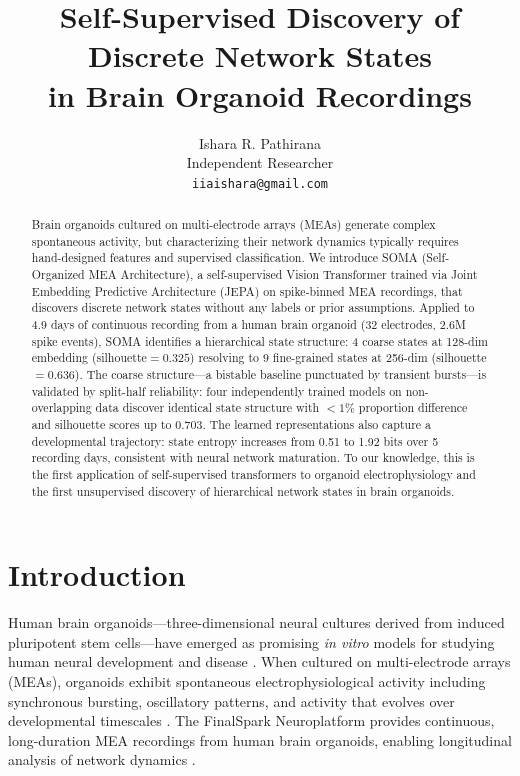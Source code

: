 \documentclass{article}
\title{Self-Supervised Discovery of Discrete Network States\\in Brain Organoid Recordings}
\author{
  Ishara R. Pathirana\\
  Independent Researcher\\
  \texttt{iiaishara@gmail.com}
}
\date{}
\begin{document}
\maketitle

\begin{abstract}
Brain organoids cultured on multi-electrode arrays (MEAs) generate complex spontaneous activity, but characterizing their network dynamics typically requires hand-designed features and supervised classification. We introduce SOMA (Self-Organized MEA Architecture), a self-supervised Vision Transformer trained via Joint Embedding Predictive Architecture (JEPA) on spike-binned MEA recordings, that discovers discrete network states without any labels or prior assumptions. Applied to 4.9 days of continuous recording from a human brain organoid (32 electrodes, 2.6M spike events), SOMA identifies a hierarchical state structure: 4 coarse states at 128-dim embedding (silhouette$=0.325$) resolving to 9 fine-grained states at 256-dim (silhouette$=0.636$). The coarse structure---a bistable baseline punctuated by transient bursts---is validated by split-half reliability: four independently trained models on non-overlapping data discover identical state structure with $<1\%$ proportion difference and silhouette scores up to 0.703. The learned representations also capture a developmental trajectory: state entropy increases from 0.51 to 1.92 bits over 5 recording days, consistent with neural network maturation. To our knowledge, this is the first application of self-supervised transformers to organoid electrophysiology and the first unsupervised discovery of hierarchical network states in brain organoids.
\end{abstract}

\section{Introduction}

Human brain organoids---three-dimensional neural cultures derived from induced pluripotent stem cells---have emerged as promising \textit{in vitro} models for studying human neural development and disease \citep{lancaster2013cerebral, pasca2019assembloids}. When cultured on multi-electrode arrays (MEAs), organoids exhibit spontaneous electrophysiological activity including synchronous bursting, oscillatory patterns, and activity that evolves over developmental timescales \citep{trujillo2019complex, sharf2022functional}. The FinalSpark Neuroplatform provides continuous, long-duration MEA recordings from human brain organoids, enabling longitudinal analysis of network dynamics \citep{jordan2024open}.
\end{document}

